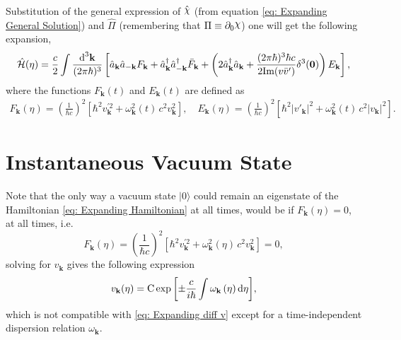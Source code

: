Substitution of the general expression of $\hat{\rchi}$ (from equation \ref{eq: Expanding General Solution}) and $\hat{\Pi}$ (remembering that $\Pi\equiv\partial_0\rchi$) one will get the following expansion,
\begin{equation}\label{eq: Expanding Hamiltonian}
	\hat{\mathcal{H}}(\eta)=\frac{c}{2}\int\frac{\text{d}^3\mathbf{k}}{(2\pi\hbar)^3}\left[\hat{a}_\mathbf{k}\hat{a}_{-\mathbf{k}}F_\mathbf{k}+\hat{a}^\dagger_\mathbf{k}\hat{a}^\dagger_{-\mathbf{k}}\bar F_\mathbf{k}+\left(2\hat{a}_\mathbf{k}^\dagger\hat{a}_\mathbf{k}+\frac{(2\pi\hbar)^3\hbar c}{2\text{Im}(v\bar v')}\delta^3(\mathbf{0})\right)E_\mathbf{k}\right],
\end{equation}
where the functions $F_\mathbf{k}(t)$ and $E_\mathbf{k}(t)$ are defined as
\begin{subequations}
	\begin{gather}
		F_\mathbf{k}(\eta)=\left(\frac{1}{\hbar c}\right)^2\left[\hbar^2v^{'2}_\mathbf{k}+\omega^2_\mathbf{k}(t)\,c^2 v_\mathbf{k}^2\right],\quad E_\mathbf{k}(\eta)=\left(\frac{1}{\hbar c}\right)^2\left[\hbar^2\big|v'_\mathbf{k}\big|^2+\omega^2_\mathbf{k}(t)\,c^2 \big|v_\mathbf{k}\big|^2\right].\tag{\theequation \,\,a,b}
	\end{gather}
\end{subequations}
\section{Instantaneous Vacuum State}
Note that the only way a vacuum state $|0\rangle$ could remain an eigenstate of the Hamiltonian \ref{eq: Expanding Hamiltonian} at all times, would be if $F_\mathbf{k}(\eta)=0$, at all times, i.e.
\begin{equation}
	F_\mathbf{k}(\eta)=\left(\frac{1}{\hbar c}\right)^2\left[\hbar^2v^{'2}_\mathbf{k}+\omega^2_\mathbf{k}(\eta)\,c^2 v_\mathbf{k}^2\right]=0,
\end{equation}
solving for $v_\mathbf{k}$ gives the following expression
\begin{equation}
	v_\mathbf{k}(\eta)=\text{C}\exp{\left[\pm \frac{c}{i\hbar}\int\omega_\mathbf{k}\left(\eta\right)\text{d}\eta\right]},
\end{equation}
which is not compatible with \ref{eq: Expanding diff v} except for a time-independent dispersion relation $\omega_\mathbf{k}$.

